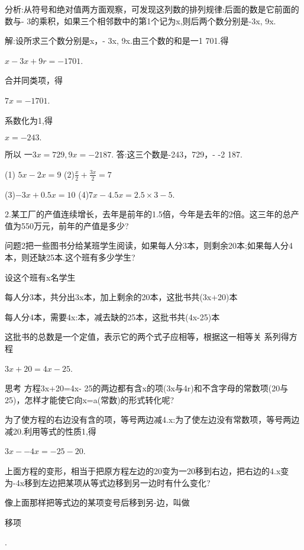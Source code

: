 \documentclass{article}
\begin{document}
\begin{article}
\begin{example}
      分析:从符号和绝对值两方面观察，可发现这列数的排列规律:后面的数是它前面的数与- 3的乘积，如果三个相邻数中的第1个记为x,则后两个数分别是-3x, 9x.      
      
      解:设所求三个数分别是x，- 3x, 9x.由三个数的和是一1 701.得 
      
      $x-3x+9r=-1701$. 
      
      合并同类项，得 
      
      $7x=-1 701$. 
      
      系数化为1,得
      
      $x=-243.$      
      
      所以      
      $一3x=729,9x=-2187$.      
      答:这三个数是-243，729，- -2 187.
      \end{example}
      
      \begin{exercise}
      (1) $5x-2x=9$  (2)$\frac{x}{2}+\frac{3x}{2}=7$
      
      (3)$-3x+0.5x=10$ (4)$7x-4.5x=2.5\times3-5$.
      
      2.某工厂的产值连续增长，去年是前年的1.5倍，今年是去年的2倍。这三年的总产值为550万元，前年的产值是多少?
      \end{exercise}
      
      \begin{example}
      问题2把一些图书分给某班学生阅读，如果每人分3本，则剩余20本;如果每人分4本，则还缺25本.这个班有多少学生?
      
      设这个班有x名学生
      
      每人分3本，共分出3x本，加上剩余的20本，这批书共(3x+20)本
      
      每人分4本，需要4x:本，减去缺的25本，这批书共(4x-25)本
      
      这批书的总数是一个定值，表示它的两个式子应相等，根据这一相等关 系列得方程
      
      $3x+20=4x-25$.
     
     思考
     方程3x+20=4x- 25的两边都有含x的项(3x与4r)和不含字母的常数项(20与25)，怎样才能使它向x=a(常数)的形式转化呢?
     
     为了使方程的右边没有含的项，等号两边减4.x:为了使左边没有常数项，等号两边减20.利用等式的性质1,得
     
     $3x--4x=-25-20$.
     
     上面方程的变形，相当于把原方程左边的20变为一20移到右边，把右边的4.x变为-4x移到左边把某项从等式边移到另一边时有什么变化?
     
     像上面那样把等式边的某项变号后移到另-边，叫做\begin{defination}移项\end{defination}.
    \end{example}
    

\end{article}
\end{document}
